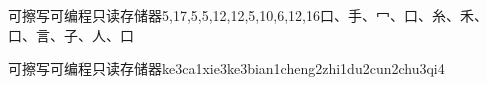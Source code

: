 \begin{entry*}{可擦写可编程只读存储器}{5,17,5,5,12,12,5,10,6,12,16}{⼝、⼿、⼍、⼝、⽷、⽲、⼝、⾔、⼦、⼈、⼝}
  \begin{phonetics}{可擦写可编程只读存储器}{ke3ca1xie3ke3bian1cheng2zhi1du2cun2chu3qi4}
  \end{phonetics}
\end{entry*}
